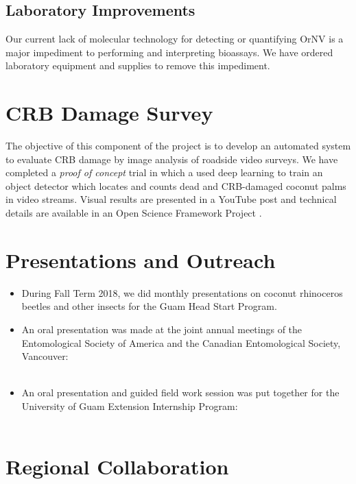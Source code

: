 \documentclass[12pt,letterpaper,english,bibliography=totocnumbered]{scrartcl}
\begin{document}
\subsection{Laboratory Improvements}

Our current lack of molecular technology for detecting or quantifying OrNV is a major impediment to performing and interpreting bioassays. We have ordered laboratory equipment and supplies to remove this impediment. 


\section{CRB Damage Survey}

The objective of this component of the project is to develop an automated system to evaluate CRB damage by image analysis of roadside video surveys.  We have completed a \textit{proof of concept} trial in which a used deep learning to train an object detector which locates and counts dead and CRB-damaged coconut palms in video streams.  Visual results are presented in a YouTube post \cite{moore_training_2019} and technical details are available in an Open Science Framework Project \cite{moore_open_2019}.

\section{Presentations and Outreach}

\begin{itemize}
	\item During Fall Term 2018, we did monthly presentations on coconut rhinoceros beetles and other insects for the Guam Head Start Program.
	\item An oral presentation was made at the joint annual meetings of the Entomological Society of America and the Canadian Entomological Society, Vancouver: \\\\ 
	\item An oral presentation and guided field work session was put together for the University of Guam Extension Internship Program: \\\\ 	
\end{itemize}

\newpage
\section{Regional Collaboration}
\end{document}
